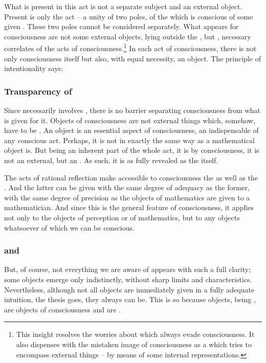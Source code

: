 What is present in this act is not a separate subject and an external 
object. Present is only the act -- a unity of two poles, of the  which is 
conscious of some given . These two poles cannot be 
considered separately.
What appears for consciousness are not some 
external objects, lying outside the , but  
, necessary correlates of the acts of 
consciousness.\footnote{This insight resolves the 
worries about  
which always evade consciousness. It also dispenses with the mistaken 
image of consciousness as a  which tries to encompass 
external things -- by means of some internal representations.}
In each act of consciousness, there is not only consciousness itself
but also, with equal necessity, an object. 
The principle of intentionality says:\vspace*{-4ex} 
\vspace*{-6ex}
%
\subsubsection{Transparency of }
Since  necessarily involves , there is 
no barrier separating consciousness from what is given for it.
Objects of consciousness are not external things which, somehow, have to 
be . 
An object is an essential aspect
of consciousness, an indispensable 
of  any conscious act.
Perhaps, it is not  in exactly the same 
way as a mathematical object is. 
But being an inherent part of the whole act, it is  by consciousness, 
it is not an external, but an . As such, it is as fully revealed 
as the  itself. 

The acts of rational reflection make accessible to consciousness the 
 as well as the . And the latter can be 
given with the same degree of adequacy as the former, with the same 
degree of precision as the objects of mathematics are given to a 
mathematician. 
And since this is the general feature of 
consciousness, it applies not only to the objects of perception or of 
mathematics, but to any objects whatsoever of which we can be 
conscious.

\subsubsection{ and }
But, of course, not everything we are aware of appears with such a 
full clarity; some objects emerge only indistinctly, without sharp 
limits and characteristics. Nevertheless, although not all objects are 
immediately given in a fully adequate intuition, the thesis goes, 
they always can be. This is so because objects, being  
, are objects of consciousness and are 
.  

